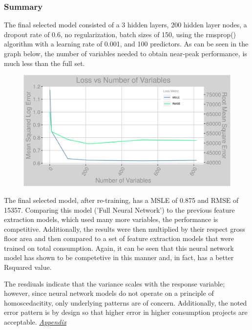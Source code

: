 \subsubsection{Summary}
The final selected model consisted of a 3 hidden layers, 200 hidden layer nodes, a dropout rate of 0.6, no regularization, batch sizes of 150, using the rmsprop() algorithm with a learning rate of 0.001, and 100 predictors.  As can be seen in the graph below, the number of variables needed to obtain near-peak performance, is much less than the full set.

\begin{figure}[h]
\centering
\includegraphics[width=\textwidth, height=0.25\textheight]{Images/electricity_psf_nn_error.png}
\end{figure}

The final selected model, after re-training, has a MSLE of 0.875 and RMSE of 15357.  Comparing this model ('Full Neural Network') to the previous feature extraction models, which used many more variables, the performance is competitive.  Additionally, the results were then multiplied by their respect gross floor area and then compared to a set of feature extraction models that were trained on total consumption.  Again, it can be seen that this neural network model has shown to be competetive in this manner and, in fact, has a better Rsquared value.

The resdiuals indicate that the variance scales with the response variable; however, since neural network models do not operate on a principle of homoscedacitity, only underlying patterns are of concern. Additionally, the noted error pattern is by design so that higher error in higher consumption projects are acceptable.  \textit{\hyperref[appendix_nn:electricity:nn_full]{Appendix}}

